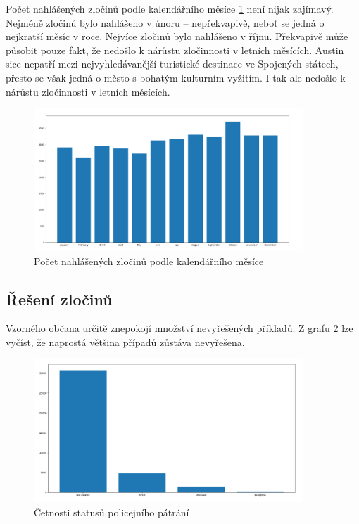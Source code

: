 \documentclass{article}
\begin{document}
Počet nahlášených zločinů podle kalendářního měsíce \ref{fig:crime_per_each_month} není
nijak zajímavý. Nejméně zločinů bylo nahlášeno v únoru -- nepřekvapivě, neboť se jedná
o nejkratší měsíc v roce. Nejvíce zločinů bylo nahlášeno v říjnu. Překvapivě může působit
pouze fakt, že nedošlo k nárůstu zločinnosti v letních měsících. Austin sice nepatří
mezi nejvyhledávanější turistické destinace ve Spojených státech, přesto se však jedná
o město s bohatým kulturním vyžitím. I tak ale nedošlo k nárůstu zločinnosti v letních měsících.

\begin{figure}
  \centering
  \includegraphics[width=0.9\textwidth]{figures/crime_per_each_month.png}
  \caption{Počet nahlášených zločinů podle kalendářního měsíce}
  \label{fig:crime_per_each_month}
\end{figure}

\subsection{Řešení zločinů}

Vzorného občana určitě znepokojí množství nevyřešených příkladů. Z grafu \ref{fig:clearance_status}
lze vyčíst, že naprostá většina případů zůstáva nevyřešena.

\begin{figure}
  \centering
  \includegraphics[width=0.9\textwidth]{figures/clearance_status.png}
  \caption{Četnosti statusů policejního pátrání}
  \label{fig:clearance_status}
\end{figure}
\end{document}
